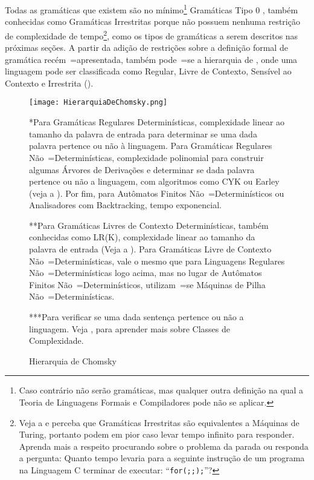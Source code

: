 Todas as gramáticas que existem são no mínimo\footnote{
Caso contrário não serão gramáticas,
mas qualquer outra definição na qual a Teoria de Linguagens Formais e
Compiladores pode não se aplicar.
}
Gramáticas Tipo 0 \cite{ahoTheoryOfParsing,chomskyGrammars1956},
também conhecidas como Gramáticas Irrestritas porque não possuem nenhuma restrição de complexidade de tempo\footnote{
Veja a  e
perceba que Gramáticas Irrestritas são equivalentes a Máquinas de Turing,
portanto podem em pior caso levar tempo infinito para responder.
Aprenda mais a respeito procurando sobre o problema da parada  ou
responda a pergunta:
Quanto tempo levaria para a seguinte instrução de um programa na Linguagem C terminar de executar:
``\texttt{for(;;);}''?
},
como os tipos de gramáticas a serem descritos nas próximas seções.
A partir da adição de restrições sobre a definição formal de gramática recém~=apresentada,
também pode~=se  a hierarquia de ,
onde uma linguagem pode ser classificada como Regular,
Livre de Contexto,
Sensível ao Contexto e
Irrestrita ().
\begin{figure}[!htb]
\caption{Hierarquia de Chomsky}
\label{figure:FigureHierarquiaDeChomsky}
\centering
\texttt{[image: HierarquiaDeChomsky.png]}
\begin{minipage}{\textwidth} \footnotesize
*Para Gramáticas Regulares Determinísticas,
complexidade linear ao tamanho da palavra de entrada para determinar se uma dada palavra pertence ou
não à linguagem.
Para Gramáticas Regulares Não~=Determinísticas,
complexidade polinomial para construir algumas Árvores de Derivações e
determinar se dada palavra pertence ou
não a linguagem,
com algoritmos como CYK ou
Earley (veja a ).
Por fim,
para Autômatos Finitos Não~=Determinísticos ou
Analisadores com Backtracking,
tempo exponencial.

**Para Gramáticas Livres de Contexto Determinísticas,
também conhecidas como LR(K),
complexidade linear ao tamanho da palavra de entrada (Veja a ).
Para Gramáticas Livre de Contexto Não~=Determinísticas,
vale o mesmo que para Linguagens Regulares Não~=Determinísticas logo acima,
mas no lugar de Autômatos Finitos Não~=Determinísticos,
utilizam~=se Máquinas de Pilha Não~=Determinísticas.

***Para verificar se uma dada sentença pertence ou
não a linguagem.
Veja ,
para aprender mais sobre Classes de Complexidade.
\end{minipage}
\end{figure}

